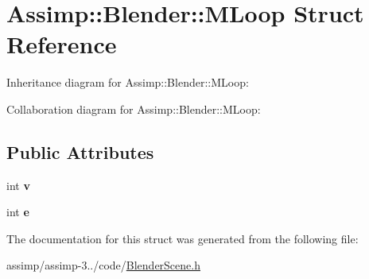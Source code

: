 \hypertarget{struct_assimp_1_1_blender_1_1_m_loop}{\section{Assimp\+:\+:Blender\+:\+:M\+Loop Struct Reference}
\label{struct_assimp_1_1_blender_1_1_m_loop}
}


Inheritance diagram for Assimp\+:\+:Blender\+:\+:M\+Loop\+:


Collaboration diagram for Assimp\+:\+:Blender\+:\+:M\+Loop\+:
\subsection*{Public Attributes}
\begin{DoxyCompactItemize}
\item 
\hypertarget{struct_assimp_1_1_blender_1_1_m_loop_ab80b4252741422749ae5827c2821422b}{int {\bfseries v}}\label{struct_assimp_1_1_blender_1_1_m_loop_ab80b4252741422749ae5827c2821422b}

\item 
\hypertarget{struct_assimp_1_1_blender_1_1_m_loop_a76094f85de6f2069d61c207f45114f52}{int {\bfseries e}}\label{struct_assimp_1_1_blender_1_1_m_loop_a76094f85de6f2069d61c207f45114f52}

\end{DoxyCompactItemize}


The documentation for this struct was generated from the following file\+:\begin{DoxyCompactItemize}
\item 
assimp/assimp-\/3../code/\hyperlink{_blender_scene_8h}{Blender\+Scene.\+h}\end{DoxyCompactItemize}
